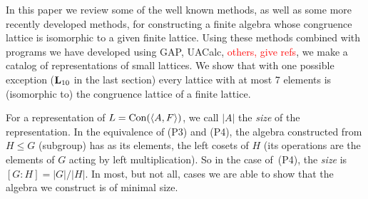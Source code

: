 \begin{comment}
\textcolor{red}{Move the next two paragraphs further back.}

\textcolor{purple}{
If $L$ is isomorphic to the lattice of subgroups of $G$
containing a subgroup $H$, then $L$ is isomorphic to the congruence
lattice of the algebra whose elements are the left cosets of $H$
and whose operations are left multiplication by elements of~$G$;
that is, the group action of $G$ on the left cosets of~$H$;
see~\cite{Bergman2012,alvi:1987}. Conversely, if 
$\bA = \langle A,F \rangle$  is a finite algebra with each element
of $F$ a permutation on $A$, then the congruence lattice 
$\Con(\bA)$ of~$\bA$ is isomorphic to the lattice of all 
subgroups of $G$ containing $H$ (the overgroups of $H$ in $G$),
where $G$ is the group generated by $F$ and $H = G_a$ is the stabilizer of a point.}


\textcolor{purple}{
On the other hand, the
\Palfy-\Pudlak theorem does not prove that if 
a particular lattice $L$
is a congruence lattice of a finite algebra then it 
is (isomorphic to) an interval of a subgroup lattice of a finite
group so
it is possible that there is a congruence lattice $L$ of a finite
algebra that is not an interval sublattice of a finite group. }
\end{comment}

In this paper we review some of the well known methods, as well as 
some more recently developed methods, for constructing a finite
algebra whose congruence lattice is isomorphic to a given finite
lattice. 
Using these methods combined with programs we have developed using
GAP, UACalc, \textcolor{red}{others, give refs},
we make a catalog of representations of small
lattices. We show that with one possible
exception ($\mathbf{L}_{10}$ in the last section) every 
lattice with at most 7 elements is (isomorphic to) the 
congruence lattice of a finite lattice. 

For a representation of $L = \operatorname{Con}(\langle A,F \rangle)$, we call
$|A|$ the \emph{size} of the representation. In the equivalence of
(P3) and (P4), the algebra constructed from $H \le G$ (subgroup) has
as its elements, the left cosets of $H$ (its operations are
the elements of $G$ acting by left multiplication). So in the case of~(P4),
the \emph{size} is $[G:H] = |G|/|H|$. 
In most, but not all,
cases we are able to show that the algebra we construct is 
of minimal size. 



